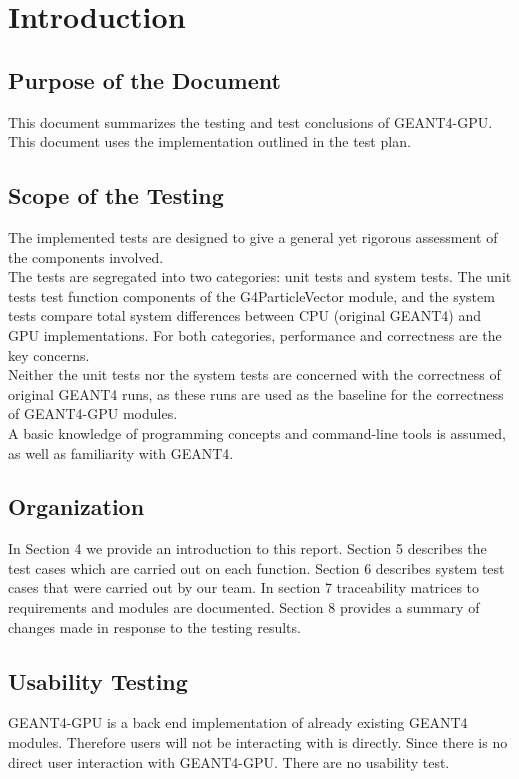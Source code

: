 \documentclass[12pt]{article}
\begin{document}
\section{Introduction}
\subsection{Purpose of the Document}
This document summarizes the testing and test conclusions of GEANT4-GPU. This document uses the implementation outlined in the test plan.

\subsection{Scope of the Testing}
The implemented tests are designed to give a general yet rigorous assessment of the components involved.\\

The tests are segregated into two categories: unit tests and system tests.
The unit tests test function components of the G4ParticleVector module, and the system tests compare total system differences between CPU (original GEANT4) and GPU implementations. For both categories, performance and correctness are the key concerns.\\

Neither the unit tests nor the system tests are concerned with the correctness of original GEANT4 runs, as these runs are used as the baseline for the correctness of GEANT4-GPU modules.\\

A basic knowledge of programming concepts and command-line tools is assumed, as well as familiarity with GEANT4.

\subsection{Organization}
In Section 4 we provide an introduction to this report. Section 5 describes the test cases which are carried out on each function. Section 6 describes system test cases that were carried out by our team. In section 7 traceability matrices to requirements and modules are documented. Section 8 provides a summary of changes made in response to the testing results.

\subsection{Usability Testing}
GEANT4-GPU is a back end implementation of already existing GEANT4 modules. Therefore users will not be interacting with is directly. Since there is no direct user interaction with GEANT4-GPU. There are no usability test. 
\end{document}
